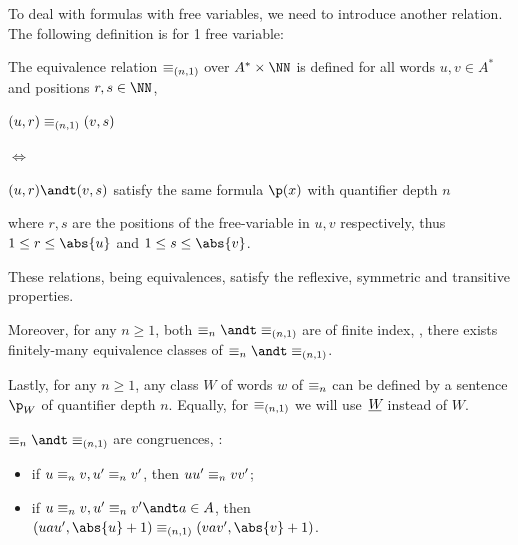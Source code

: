 \documentclass[oneside]{academica}
\begin{document}
To deal with formulas with free variables, we need to introduce another relation.
The following definition is for 1 free variable:
\begin{definition*}[$(n,1)$-equivalence]
  The equivalence relation $\equiv_{(n,1)}$ over $A^* \times \NN$ is defined for all words $u,v \in A^*$ and positions $r,s \in \NN$, \st

  \bigskip
  \begin{minipage}{0.13\textwidth}
    \hfill
  \end{minipage}
  \begin{minipage}{0.25\textwidth}
    $(u,r) \equiv_{(n,1)} (v,s)$
  \end{minipage}
  \begin{minipage}{0.1\textwidth}
    $\iff$
  \end{minipage}
  \begin{minipage}{0.45\textwidth}
    \begin{center}
      $(u,r) \andt (v,s)$ satisfy the same formula $\px$ with quantifier depth $n$
    \end{center}
  \end{minipage}
  \hfill

  \bigskip
  where $r,s$ are the positions of the free-variable in $u,v$ respectively, thus $1 \le r \le \abs{u}$ and $1 \le s \le \abs{v}$.
\end{definition*}


These relations, being equivalences, satisfy the reflexive, symmetric and transitive properties.

Moreover, for any $n \ge 1$, both $\eqn \andt \eqnn$ are of finite index, \ie, there exists finitely-many equivalence classes of $\eqn \andt \eqnn$.

Lastly, for any $n \ge 1$, any class $W$ of words $w$ of $\equiv_{n}$ can be defined by a sentence $\p_W$ of quantifier depth $n$.
Equally, for $\equiv_{(n,1)}$ we will use $\,\underline{{W}\!}$ instead of $W$.


\begin{proposition}\label{prop:2}
  $\eqn \andt \eqnn$ are congruences, \ie:
  \begin{itemize}
    \item if $u \equiv_{n} v, u' \equiv_{n} v'$, then $uu' \equiv_{n} vv'$;
    \item if $u \eqn v, u' \eqn v' \andt a \in A$, then $(uau', \abs{u}+1) \eqnn (vav', \abs{v}+1)$.
  \end{itemize}
\end{proposition}
\end{document}
